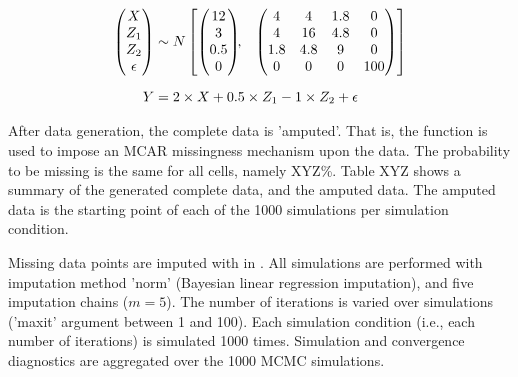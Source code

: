 \documentclass[article]{jss}
\newcommand{\fct}[1]{\code{#1()}}
\begin{document}
\begin{align*}
\begin{pmatrix}X\\
Z_{1}\\
Z_{2}\\
\epsilon
\end{pmatrix} &\sim  N
\begin{bmatrix}
\begin{pmatrix}
12\\
3\\
0.5\\
0
\end{pmatrix}\!\!,&
\begin{pmatrix}
4 & 4 & 1.8 & 0\\
4 & 16 & 4.8 & 0\\
1.8 & 4.8 & 9 & 0\\
0 & 0 & 0 & 100
\end{pmatrix}
\end{bmatrix}\\[2\jot]
Y &=  2 \times X + 0.5 \times Z_1 - 1 \times Z_2 + \epsilon
\end{align*}

After data generation, the complete data is 'amputed'. That is, the  function \fct{ampute} is used to impose an MCAR missingness mechanism upon the data. The probability to be missing is the same for all cells, namely XYZ\%. %
Table XYZ shows a summary of the generated complete data, and the amputed data. The amputed data is the starting point of each of the 1000 simulations per simulation condition.

Missing data points are imputed with  in . All simulations are performed with imputation method 'norm' (Bayesian linear regression imputation), and five imputation chains ($m = 5$). The number of iterations is varied over simulations ('maxit' argument between 1 and 100). Each simulation condition (i.e., each number of iterations) is simulated 1000 times. Simulation and convergence diagnostics are aggregated over the 1000 MCMC simulations. 
\end{document}
